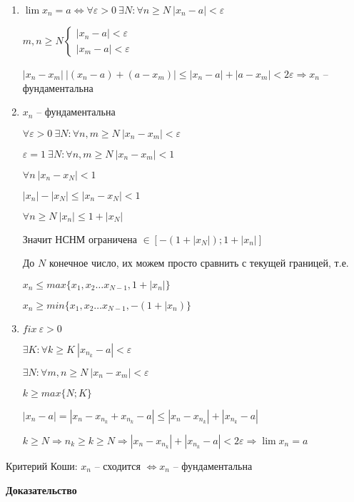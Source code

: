 \documentclass[14pt, letter paper]{article}
\begin{document}
\begin{enumerate}
    \item $\lim{x_n} = a \Leftrightarrow \forall \varepsilon > 0\ \exists N : \forall n \geq N\ |x_n - a| < \varepsilon$

    $m, n \geq N \begin{cases}
        |x_n - a| < \varepsilon \\
        |x_m - a| < \varepsilon
    \end{cases}$

    $|x_n - x_m| \ |(x_n - a) + (a - x_m)| \leq |x_n - a| + |a - x_m| < 2 \varepsilon \Rightarrow x_n$ -- фундаментальна

    \item $x_n$ -- фундаментальна

    $\forall \varepsilon > 0\ \exists N : \forall n, m \geq N\ |x_n - x_m| < \varepsilon$

    $\varepsilon = 1\ \exists N : \forall n, m \geq N\ |x_n - x_m| < 1$

    $\forall n\ |x_n - x_N| < 1$

    $|x_n| - |x_N| \leq |x_n - x_N| < 1$

    $\forall n \geq N\ |x_n| \leq 1 + |x_N|$

    Значит НСНМ ограничена $\in [-(1 + |x_N|);1 + |x_n|]$

    До $N$ конечное число, их можем просто сравнить с текущей границей, т.е.

    $x_n \leq max\{x_1, x_2 \ldots x_{N-1}, 1 + |x_n|\}$

    $x_n \geq min\{x_1, x_2 \ldots x_{N-1}, -(1 + |x_n)\}$

    \item $fix\ \varepsilon > 0$

    $\exists K : \forall k \geq K\ |x_{n_k} - a| < \varepsilon$

    $\exists N : \forall m, n \geq N\ |x_n - x_m| < \varepsilon$

    $k \geq max \{N;K\}$

    $|x_n - a| = |x_n - x_{n_k} + x_{n_k} - a| \leq |x_n - x_{n_k}| + |x_{n_k} - a|$

    $k \geq N \Rightarrow n_k \geq k \geq N \Rightarrow |x_n - x_{n_k}| + |x_{n_k} - a| < 2 \varepsilon \Rightarrow \lim{x_n} = a$
\end{enumerate}

Критерий Коши: $x_n$ -- сходится $\Leftrightarrow x_n$ -- фундаментальна

\begin{center}
    \textbf{Доказательство}
\end{center}
\end{document}
